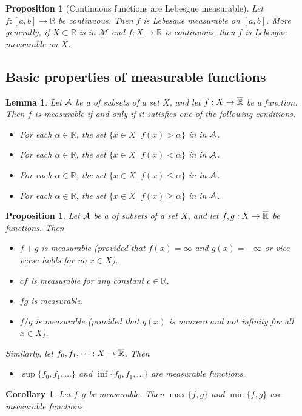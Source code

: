 \documentclass[10pt, oneside, reqno]{amsart}
\theoremstyle{plain}%
\newtheorem{lem}[thm]{Lemma}
\newtheorem{prop}[thm]{Proposition}
\newtheorem*{cor}{Corollary}
\theoremstyle{definition}
\theoremstyle{remark}
\newcommand{\given}{ \, | \,}
\newcommand{\R}{\mathbb{R}}
\begin{document}
\begin{prop}[Continuous functions are Lebesgue measurable]
	Let $f: [a,b] \rightarrow \R$ be continuous.  Then $f$ is Lebesgue measurable on $[a,b]$.  More generally, if $X \subset \R$ is in $\mathcal{M}$ and $f: X \rightarrow \R$ is continuous, then $f$ is Lebesgue measurable on $X$.
\end{prop}

\subsection{Basic properties of measurable functions} %
\label{sub:basic_properties_of_measurable_functions}

\begin{lem}
	Let $\mathcal{A}$ be a \sig of subsets of a set $X$, and let $f : X \rightarrow \Rbar$ be a function.  Then $f$ is measurable if and only if it satisfies one of the following conditions.
	\begin{itemize}
		\item For each $\alpha \in \R$, the set $\{ x \in X \given f(x) > \alpha \}$ in in $\mathcal{A}$.
		\item For each $\alpha \in \R$, the set $\{ x \in X \given f(x) < \alpha \}$ in in $\mathcal{A}$.
		\item For each $\alpha \in \R$, the set $\{ x \in X \given f(x) \leq \alpha \}$ in in $\mathcal{A}$.
		\item For each $\alpha \in \R$, the set $\{ x \in X \given f(x) \geq \alpha \}$ in in $\mathcal{A}$.
	\end{itemize}
\end{lem}

\begin{prop}Let $\mathcal{A}$ be a \sig of subsets of a set $X$, and let $f,g : X \rightarrow \Rbar$ be functions.  Then 
	\begin{itemize}
		\item $f + g$ is measurable (provided that $f(x) = \infty$ and $g(x) = - \infty$ or vice versa holds for no $x \in X$).
		\item $cf$ is measurable for any constant $c \in \R$.
		\item $fg$ is measurable.
		\item $f/g$ is measurable (provided that $g(x)$ is nonzero and not infinity for all $x \in X$).
	\end{itemize}
	
	Similarly, let $f_0,f_1,\dots : X \rightarrow \Rbar$.  Then 
	\begin{itemize}
		\item $\sup\{f_0,f_1,\dots\}$ and $\inf\{f_0,f_1,\dots\}$ are measurable functions.
	\end{itemize}
\end{prop}
\begin{cor}
	Let $f,g$ be measurable.  Then $\max\{f,g\}$ and $\min\{f,g\}$ are measurable functions.
\end{cor}
\end{document}
